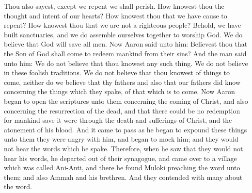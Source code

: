 Thou also sayest, except we repent we shall perish. How knowest thou the thought and intent of our hearts? How knowest thou that we have cause to repent? How knowest thou that we are not a righteous people? Behold, we have built sanctuaries, and we do assemble ourselves together to worship God. We do believe that God will save all men.
\bverse \iffalse Now Aaron said unto him: Believest thou that the Son of God shall come to redeem mankind from their sins? \fi
Now Aaron said unto him: Believest thou that the Son of God shall come to redeem mankind from their sins?
\bverse \iffalse And the man said unto him: We do not believe that thou knowest any such thing. We do not believe in these foolish traditions.  We do not believe that thou knowest of things to come, neither do we believe that thy fathers and also that our fathers did know concerning the things which they spake, of that which is to come. \fi
And the man said unto him: We do not believe that thou knowest any such thing. We do not believe in these foolish traditions.  We do not believe that thou knowest of things to come, neither do we believe that thy fathers and also that our fathers did know concerning the things which they spake, of that which is to come.
\bverse \iffalse Now Aaron began to open the scriptures unto them concerning the coming of Christ, and also concerning the resurrection of the dead, and that there could be no redemption for mankind save it were through the death and sufferings of Christ, and the atonement of his blood. \fi
Now Aaron began to open the scriptures unto them concerning the coming of Christ, and also concerning the resurrection of the dead, and that there could be no redemption for mankind save it were through the death and sufferings of Christ, and the atonement of his blood.
\bverse \iffalse And it came to pass as he began to expound these things unto them they were angry with him, and began to mock him; and they would not hear the words which he spake. \fi
And it came to pass as he began to expound these things unto them they were angry with him, and began to mock him; and they would not hear the words which he spake.
\bverse \iffalse Therefore, when he saw that they would not hear his words, he departed out of their synagogue, and came over to a village which was called Ani-Anti, and there he found Muloki preaching the word unto them; and also Ammah and his brethren. And they contended with many about the word. \fi
Therefore, when he saw that they would not hear his words, he departed out of their synagogue, and came over to a village which was called Ani-Anti, and there he found Muloki preaching the word unto them; and also Ammah and his brethren. And they contended with many about the word.
